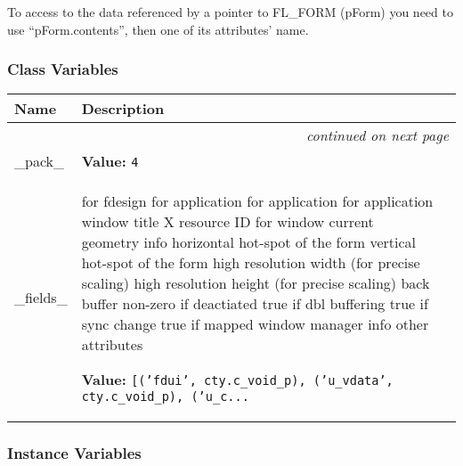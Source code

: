To access to the data referenced by a pointer to FL\_FORM (pForm) you
need to use ``pForm.contents'', then one of its attributes' name.


  \subsubsection{Class Variables}

    \vspace{-1cm}
\hspace{\varindent}\begin{longtable}{|p{\varnamewidth}|p{\vardescrwidth}|l}
\cline{1-2}
\cline{1-2} \centering \textbf{Name} & \centering \textbf{Description}& \\
\cline{1-2}
\endhead\cline{1-2}\multicolumn{3}{r}{\small\textit{continued on next page}}\\\endfoot\cline{1-2}
\endlastfoot\raggedright \_\-p\-a\-c\-k\-\_\- & \raggedright \textbf{Value:} 
{\tt 4}&\\
\cline{1-2}
\raggedright \_\-f\-i\-e\-l\-d\-s\-\_\- & \raggedright for fdesign
for application
for application
for application
window title
X resource ID for window
current geometry info
horizontal hot-spot of the form
vertical hot-spot of the form
high resolution width (for precise scaling)
high resolution height (for precise scaling)
back buffer
non-zero if deactiated
true if dbl buffering
true if sync change
true if mapped
window manager info
other attributes

\textbf{Value:} 
{\tt [('fdui', cty.c\_void\_p), ('u\_vdata', cty.c\_void\_p), ('u\_c\texttt{...}}&\\
\cline{1-2}
\end{longtable}



  \subsubsection{Instance Variables}

